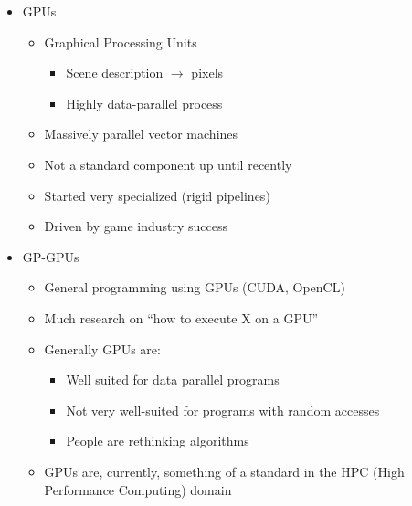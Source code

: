 \documentclass[a4paper]{article}
\begin{document}
\begin{itemize}
\item GPUs
\begin{itemize}
\item Graphical Processing Units 
\begin{itemize}
\item Scene description $\to$ pixels
\item Highly data-parallel process
\end{itemize}
\item Massively parallel vector machines
\item Not a standard component up until recently
\item Started very specialized (rigid pipelines)
\item Driven by game industry success
\end{itemize}
\item GP-GPUs
\begin{itemize}
\item General programming using GPUs (CUDA, OpenCL)
\item Much research on ``how to execute X on a GPU''
\item Generally GPUs are:
\begin{itemize}
\item Well suited for data parallel programs
\item Not very well-suited for programs with random accesses
\item People are rethinking algorithms
\end{itemize}
\item GPUs are, currently, something of a standard in the HPC (High Performance Computing) domain
\end{itemize}
\end{itemize}
\end{document}
